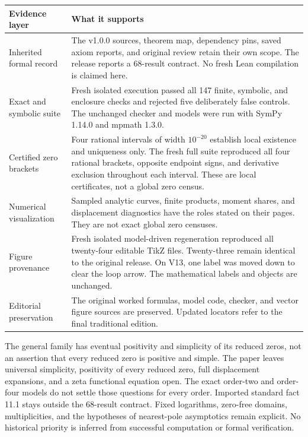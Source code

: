 {\small
\begin{tabularx}{\linewidth}{@{}p{.24\linewidth}Y@{}}\toprule
\textbf{Evidence layer} & \textbf{What it supports}\\\midrule
Inherited formal record & The v1.0.0 sources, theorem map, dependency pins, saved axiom reports, and original review retain their own scope. The release reports a 68-result contract. No fresh Lean compilation is claimed here.\\
Exact and symbolic suite & Fresh isolated execution passed all 147 finite, symbolic, and enclosure checks and rejected five deliberately false controls. The unchanged checker and models were run with SymPy 1.14.0 and mpmath 1.3.0.\\
Certified zero brackets & Four rational intervals of width $10^{-20}$ establish local existence and uniqueness only. The fresh full suite reproduced all four rational brackets, opposite endpoint signs, and derivative exclusion throughout each interval. These are local certificates, not a global zero census.\\
Numerical visualization & Sampled analytic curves, finite products, moment shares, and displacement diagnostics have the roles stated on their pages. They are not exact global zero censuses.\\
Figure provenance & Fresh isolated model-driven regeneration reproduced all twenty-four editable TikZ files. Twenty-three remain identical to the original release. On V13, one label was moved down to clear the loop arrow. The mathematical labels and objects are unchanged.\\
Editorial preservation & The original worked formulas, model code, checker, and vector figure sources are preserved. Updated locators refer to the final traditional edition.\\\bottomrule
\end{tabularx}}

The general family has eventual positivity and simplicity of its reduced zeros, not an assertion that every reduced zero is positive and simple. The paper leaves universal simplicity, positivity of every reduced zero, full displacement expansions, and a zeta functional equation open. The exact order-two and order-four models do not settle those questions for every order.
Imported standard fact 11.1 stays outside the 68-result contract. Fixed logarithms, zero-free domains, multiplicities, and the hypotheses of nearest-pole asymptotics remain explicit. No historical priority is inferred from successful computation or formal verification.

